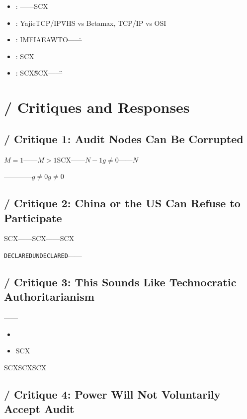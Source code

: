 \documentclass[12pt,a4paper]{article}
\theoremstyle{remark}
\newcommand{\UNDECLARED}{\texttt{UNDECLARED}}
\newcommand{\DECLARED}{\texttt{DECLARED}}
\begin{document}
\begin{itemize}[nosep]
    \item \textbf{}: ——SCX
    \item \textbf{}: YajieTCP/IP\"\"VHS vs Betamax, TCP/IP vs OSI
    \item \textbf{}: IMFIAEAWTO——\"\"
    \item \textbf{}: SCX
    \item \textbf{}: SCX\"\"\"\"SCX——\"\"
\end{itemize}


\section{ / Critiques and Responses}

\subsection{ / Critique 1: Audit Nodes Can Be Corrupted}

\textbf{}$M=1$——$M>1$SCX——$N-1$$g \neq 0$\textbf{}——$N$

————$g \neq 0$$g \neq 0$

\subsection{ / Critique 2: China or the US Can Refuse to Participate}

\textbf{}SCX——SCX——SCX\textbf{}

\DECLARED{}\UNDECLARED{}——

\subsection{ / Critique 3: This Sounds Like Technocratic Authoritarianism}

\textbf{}——\textbf{}

\begin{itemize}[nosep]
    \item 
    \item SCX
\end{itemize}

SCX\textbf{}SCXSCX

\subsection{ / Critique 4: Power Will Not Voluntarily Accept Audit}
\end{document}
